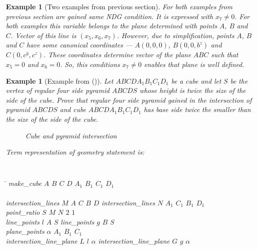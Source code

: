 \documentclass[final,1p,times,authoryear]{elsarticle}
\newtheorem{example}[theorem]{Example}
\begin{document}
\begin{example}[Two examples from previous section]
For both examples from previous section are gained same NDG
condition. It is expressed with $x_7 \neq 0$. For both examples this
variable belongs to the plane determined with points $A$, $B$ and
$C$. Vector of this line is $(x_5, x_6, x_7)$. However, due to
simplification, points $A$, $B$ and $C$ have some canonical
coordinates --- $A(0, 0, 0)$, $B(0, 0, b^z)$ and $C(0, c^y,
c^z)$. These coordinates determine vector of the plane $ABC$ such that
$x_5 = 0$ and $x_6 = 0$. So, this conditions $x_7 \neq 0$ enables that
plane is well defined.
\end{example}

\begin{example}[Example from (\cite{arhzbirka})] 
Let $ABCDA_1B_1C_1D_1$ be a cube and let $S$ be the vertex of regular
four side pyramid $ABCDS$ whose height is twice the size of the side
of the cube. Prove that regular four side pyramid gained in the
intersection of pyramid $ABCDS$ and cube $ABCDA_1B_1C_1D_1$ has base
side twice the smaller than the size of the side of the cube.

\begin{figure}[!h]
\begin{center}

\end{center}
\caption{Cube and pyramid intersection}
\end{figure}

Term representation of geometry statement is:
\begin{footnotesize}
{\tt
\begin{tabbing}
\hspace{5mm}\=\kill
\> make\_cube $A$ $B$ $C$ $D$ $A_1$ $B_1$ $C_1$ $D_1$ \ \ \ \ \ \ \ \ \ \ \ \ \= \\ \\

\>intersection\_lines $M$ $A$ $C$ $B$ $D$ \> intersection\_lines $N$ $A_1$ $C_1$ $B_1$ $D_1$\\
\>point\_ratio $S$ $M$ $N$ $2$ $1$\\ 

\>line\_points $l$ $A$ $S$ \> line\_points $g$ $B$ $S$\\

\>plane\_points $\alpha$ $A_1$ $B_1$ $C_1$\\

\>intersection\_line\_plane $L$ $l$ $\alpha$ \>  intersection\_line\_plane $G$ $g$ $\alpha$ \\


\end{tabbing}}
\end{footnotesize}
\end{example}
\end{document}
